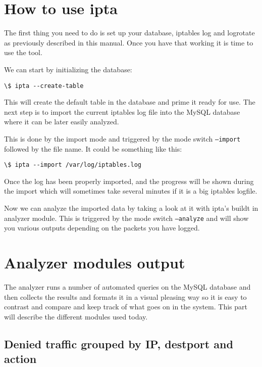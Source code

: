 \documentclass[english,twoside,openright,a4paper,12pt]{article}
\begin{document}
\section{How to use ipta}

The first thing you need to do is set up your database, iptables log
and logrotate as previously described in this manual. Once you have
that working it is time to use the tool.

We can start by initializing the database:

\begin{verbatim}
\$ ipta --create-table
\end{verbatim}

This will create the default table in the database and prime it ready
for use. The next step is to import the current iptables log file into
the MySQL database where it can be later easily analyzed.

This is done by the import mode and triggered by the mode switch
\texttt{--import} followed by the file name. It could be something
like this:

\begin{verbatim}
\$ ipta --import /var/log/iptables.log
\end{verbatim}

Once the log has been properly imported, and the progress will be
shown during the import which will sometimes take several minutes if
it is a big iptables logfile.

Now we can analyze the imported data by taking a look at it with
ipta's buildt in analyzer module. This is triggered by the mode switch
\texttt{--analyze} and will show you various outputs depending on the
packets you have logged.

\section{Analyzer modules output}

The analyzer runs a number of automated queries on the MySQL database
and then collects the results and formats it in a visual pleasing way
so it is easy to contrast and compare and keep track of what goes on
in the system. This part will describe the different modules used
today.

\subsection{Denied traffic grouped by IP, destport and action}
\end{document}
